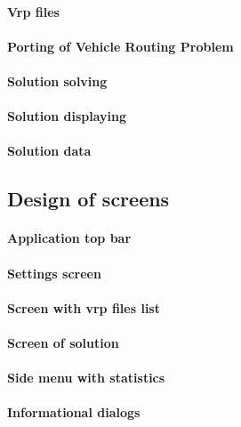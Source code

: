 \paragraph{Vrp files}

\paragraph{Porting of Vehicle Routing Problem}

\paragraph{Solution solving}

\paragraph{Solution displaying}

\paragraph{Solution data}

\subsection{Design of screens}

\paragraph{Application top bar}

\paragraph{Settings screen}

\paragraph{Screen with vrp files list}

\paragraph{Screen of solution}

\paragraph{Side menu with statistics}

\paragraph{Informational dialogs}

